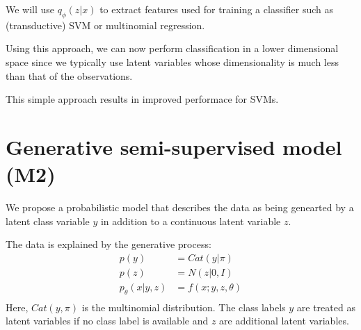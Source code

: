 \documentclass{beamer}
\let\tempone\itemize
\let\temptwo\enditemize
\renewenvironment{itemize}{\tempone\addtolength{\itemsep}{0.5\baselineskip}}{\temptwo}
\begin{document}
\begin{frame}
  \begin{center}
    \begin{itemize}
      \item We will use $q_{\phi}(z|x)$ to extract features used for training a classifier such as (transductive) SVM or multinomial regression. 
      \item Using this approach, we can now perform classification in a lower dimensional space since we typically use latent variables whose dimensionality is much less than that of the observations.
      \item This simple approach results in improved performace for SVMs.
    \end{itemize}
  \end{center}
\end{frame}

\section{Generative semi-supervised model (M2)}

\begin{frame}
  \begin{center}
    \begin{itemize}
      \item We propose a probabilistic model that describes the data as being genearted by a latent class variable
      $y$ in addition to a continuous latent variable $z$. 
      \item The data is explained by the generative process:
        \begin{align*}
          p(y) &= Cat(y|\pi)\\
          p(z) &= N(z|0,I)\\
          p_{\theta}(x|y,z) &= f(x;y,z,\theta)\\
        \end{align*}
        Here, $Cat(y,\pi)$ is the multinomial distribution. The class labels $y$ are treated as latent variables if 
        no class label is available and $z$ are additional latent variables.
    \end{itemize}
  \end{center}
\end{frame}
\end{document}
